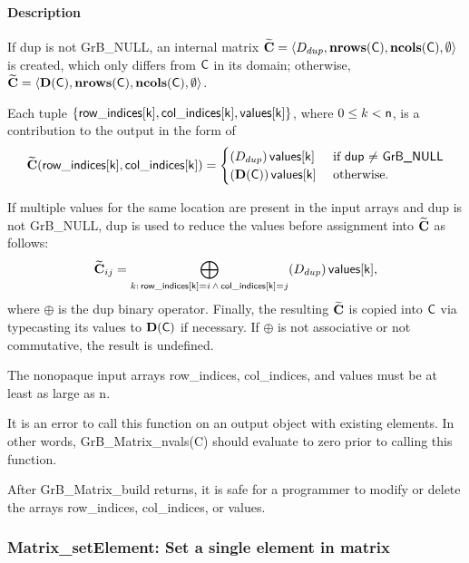 \paragraph{Description }

If {\sf dup} is not {\sf GrB\_NULL}, an internal matrix 
${\bf \widetilde{C}} = \langle D_{dup}, \mathbf{nrows}({\sf C}),
\mathbf{ncols}({\sf C}),\emptyset \rangle$ is created, which only differs from ${\sf C}$ 
in its domain; otherwise,
${\bf \widetilde{C}} = \langle \mathbf{D}({\sf C}), \mathbf{nrows}({\sf C}),
\mathbf{ncols}({\sf C}),\emptyset \rangle$. 

Each tuple $\{ {\sf row\_indices[k]}, {\sf col\_indices[k]}, {\sf values[k]}\}$, where $0\leq k < {\sf n}$, is a contribution to the output in the form of 
\[
{\bf \widetilde{C}}({\sf row\_indices[k]}, {\sf col\_indices[k]}) = 
\begin{cases} 
(D_{dup})\, {\sf values[k]} & \text{ if {\sf dup} $\neq$ {\sf GrB\_NULL}} \\
(\mathbf{D}({\sf C}))\, {\sf values[k]} & \text{ otherwise.} 
\end{cases}
\]

If multiple values for the same location are present in the input arrays and 
{\sf dup} is not {\sf GrB\_NULL}, {\sf dup} is used to reduce the values before 
assignment into ${\bf \widetilde{C}}$ as follows:
\[
{\bf \widetilde{C}}_{ij}
= \bigoplus_{k:\, {\sf row\_indices[k]} = i\, \land\, {\sf col\_indices[k]} = j}   (D_{dup})\,{\sf values[k]}
,\] 
where $\oplus$ is the {\sf dup} binary operator. Finally, the resulting 
${\bf \widetilde{C}}$ is copied into ${\sf C}$ via typecasting its values to 
$\mathbf{D}({\sf C})$ if necessary.  If $\oplus$ is not associative or not 
commutative, the result is undefined.  

The nonopaque input arrays {\sf row\_indices}, {\sf col\_indices}, and {\sf values} must be at least as large as {\sf n}. 

It is an error to call this function on an output object with existing elements. In other words, 
{\sf GrB\_Matrix\_nvals(C)} should evaluate to zero prior to calling this function.

After {\sf GrB\_Matrix\_build} returns, it is safe for a programmer to 
modify or delete the arrays {\sf row\_indices}, {\sf col\_indices}, or {\sf values}.

\subsubsection{{\sf Matrix\_setElement}: Set a single element in matrix}

